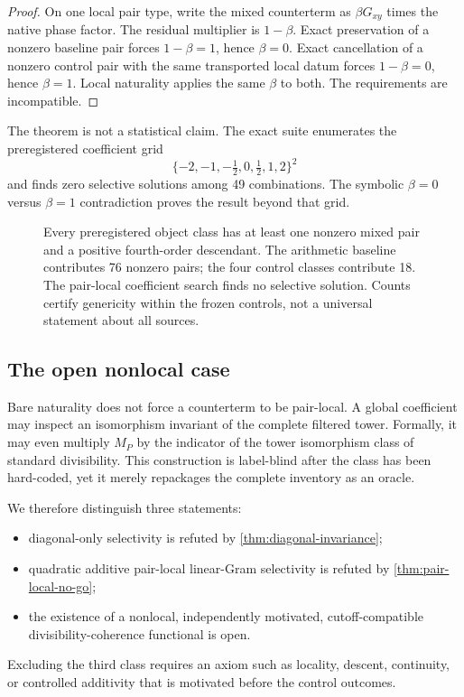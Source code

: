\begin{proof}
On one local pair type, write the mixed counterterm as
$\beta G_{xy}$ times the native phase factor.  The residual multiplier is
$1-\beta$.  Exact preservation of a nonzero baseline pair forces
$1-\beta=1$, hence $\beta=0$.  Exact cancellation of a nonzero control pair
with the same transported local datum forces $1-\beta=0$, hence $\beta=1$.
Local naturality applies the same $\beta$ to both.  The requirements are
incompatible.
\end{proof}

The theorem is not a statistical claim.  The exact suite enumerates the
preregistered coefficient grid
\begin{equation}
 \{-2,-1,-\tfrac12,0,\tfrac12,1,2\}^2
 \label{eq:coefficient-grid}
\end{equation}
and finds zero selective solutions among 49 combinations.  The symbolic
$\beta=0$ versus $\beta=1$ contradiction proves the result beyond that grid.

\begin{figure}[t]
\centering

\caption{Every preregistered object class has at least one nonzero mixed pair
and a positive fourth-order descendant.  The arithmetic baseline contributes
76 nonzero pairs; the four control classes contribute 18.  The pair-local
coefficient search finds no selective solution.  Counts certify genericity
within the frozen controls, not a universal statement about all sources.}
\label{fig:control-matrix}
\end{figure}

\subsection{The open nonlocal case}

Bare naturality does not force a counterterm to be pair-local.  A global
coefficient may inspect an isomorphism invariant of the complete filtered
tower.  Formally, it may even multiply $M_P$ by the indicator of the tower
isomorphism class of standard divisibility.  This construction is label-blind
after the class has been hard-coded, yet it merely repackages the complete
inventory as an oracle.

We therefore distinguish three statements:
\begin{itemize}
\item diagonal-only selectivity is refuted by
\cref{thm:diagonal-invariance};
\item quadratic additive pair-local linear-Gram selectivity is refuted by
\cref{thm:pair-local-no-go};
\item the existence of a nonlocal, independently motivated,
cutoff-compatible divisibility-coherence functional is open.
\end{itemize}
Excluding the third class requires an axiom such as locality, descent,
continuity, or controlled additivity that is motivated before the control
outcomes.
